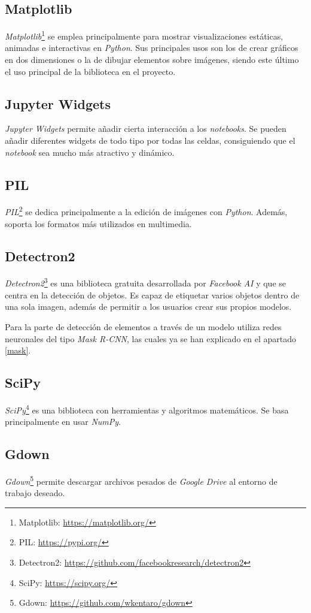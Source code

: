 \subsection{Matplotlib}
\emph{Matplotlib}\footnote{Matplotlib: \url{https://matplotlib.org/}} se emplea principalmente para mostrar visualizaciones estáticas, animadas e interactivas en \emph{Python}. Sus principales usos son los de crear gráficos en dos dimensiones o la de dibujar elementos sobre imágenes, siendo este último el uso principal de la biblioteca en el proyecto. 

\subsection{Jupyter Widgets}
\emph{Jupyter Widgets} permite añadir cierta interacción a los \emph{notebooks}. Se pueden añadir diferentes widgets de todo tipo por todas las celdas, consiguiendo que el \emph{notebook} sea mucho más atractivo y dinámico.

\subsection{PIL}
\emph{PIL}\footnote{PIL: \url{https://pypi.org/}} se dedica principalmente a la edición de imágenes con \emph{Python}. Además, soporta los formatos más utilizados en multimedia.

\subsection{Detectron2}
\emph{Detectron2}\footnote{Detectron2: \url{https://github.com/facebookresearch/detectron2}} es una biblioteca gratuita desarrollada por \emph{Facebook AI} y que se centra en la detección de objetos. Es capaz de etiquetar varios objetos dentro de una sola imagen, además de permitir a los usuarios crear sus propios modelos. 

Para la parte de detección de elementos a través de un modelo utiliza redes neuronales del tipo \emph{Mask R-CNN}, las cuales ya se han explicado en el apartado \ref{mask}.

\subsection{SciPy}
\emph{SciPy}\footnote{SciPy: \url{https://scipy.org/}} es una biblioteca con herramientas y algoritmos matemáticos. Se basa principalmente en usar \emph{NumPy}.

\subsection{Gdown}
\emph{Gdown}\footnote{Gdown: \url{https://github.com/wkentaro/gdown}} permite descargar archivos pesados de \emph{Google Drive} al entorno de trabajo deseado.

